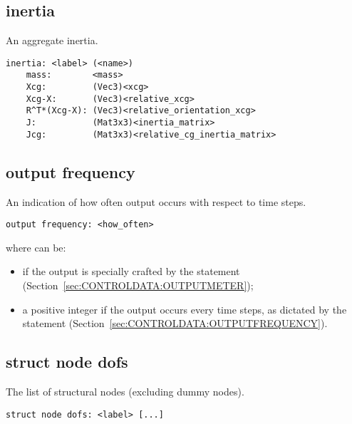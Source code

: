 \subsection{inertia}
An aggregate inertia.
\begin{verbatim}
inertia: <label> (<name>)
    mass:        <mass>
    Xcg:         (Vec3)<xcg>
    Xcg-X:       (Vec3)<relative_xcg>
    R^T*(Xcg-X): (Vec3)<relative_orientation_xcg>
    J:           (Mat3x3)<inertia_matrix>
    Jcg:         (Mat3x3)<relative_cg_inertia_matrix>
\end{verbatim}

\subsection{output frequency}
An indication of how often output occurs with respect to time steps.
\begin{verbatim}
output frequency: <how_often>
\end{verbatim}
where  can be:
\begin{itemize}
\item {} if the output is specially crafted by the
 statement (Section~\ref{sec:CONTROLDATA:OUTPUTMETER});
\item a positive integer if the output occurs every 
time steps, as dictated by the  statement
(Section~\ref{sec:CONTROLDATA:OUTPUTFREQUENCY}).
\end{itemize}

\subsection{struct node dofs}
The list of structural nodes (excluding dummy nodes).
\begin{verbatim}
struct node dofs: <label> [...]
\end{verbatim}

